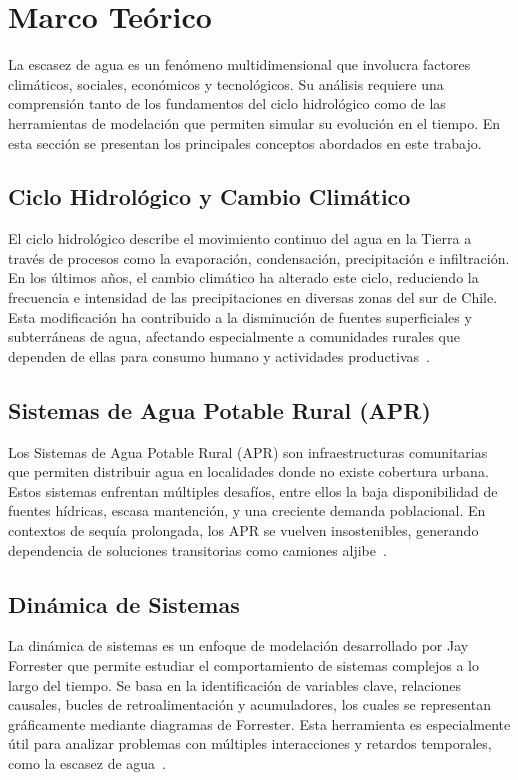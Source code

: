 \documentclass[10pt]{article}
\begin{document}
\section{Marco Teórico}

La escasez de agua es un fenómeno multidimensional que involucra factores climáticos, sociales, económicos y tecnológicos. Su análisis requiere una comprensión tanto de los fundamentos del ciclo hidrológico como de las herramientas de modelación que permiten simular su evolución en el tiempo. En esta sección se presentan los principales conceptos abordados en este trabajo.

\subsection{Ciclo Hidrológico y Cambio Climático}

El ciclo hidrológico describe el movimiento continuo del agua en la Tierra a través de procesos como la evaporación, condensación, precipitación e infiltración. En los últimos años, el cambio climático ha alterado este ciclo, reduciendo la frecuencia e intensidad de las precipitaciones en diversas zonas del sur de Chile. Esta modificación ha contribuido a la disminución de fuentes superficiales y subterráneas de agua, afectando especialmente a comunidades rurales que dependen de ellas para consumo humano y actividades productivas~\parencite{mop2019,cr2}.

\subsection{Sistemas de Agua Potable Rural (APR)}

Los Sistemas de Agua Potable Rural (APR) son infraestructuras comunitarias que permiten distribuir agua en localidades donde no existe cobertura urbana. Estos sistemas enfrentan múltiples desafíos, entre ellos la baja disponibilidad de fuentes hídricas, escasa mantención, y una creciente demanda poblacional. En contextos de sequía prolongada, los APR se vuelven insostenibles, generando dependencia de soluciones transitorias como camiones aljibe~\parencite{dgapublic2023}.
\subsection{Dinámica de Sistemas}
La dinámica de sistemas es un enfoque de modelación desarrollado por Jay Forrester que permite estudiar el comportamiento de sistemas complejos a lo largo del tiempo. Se basa en la identificación de variables clave, relaciones causales, bucles de retroalimentación y acumuladores, los cuales se representan gráficamente mediante diagramas de Forrester. Esta herramienta es especialmente útil para analizar problemas con múltiples interacciones y retardos temporales, como la escasez de agua~\parencite{sterman2000}.
\end{document}
